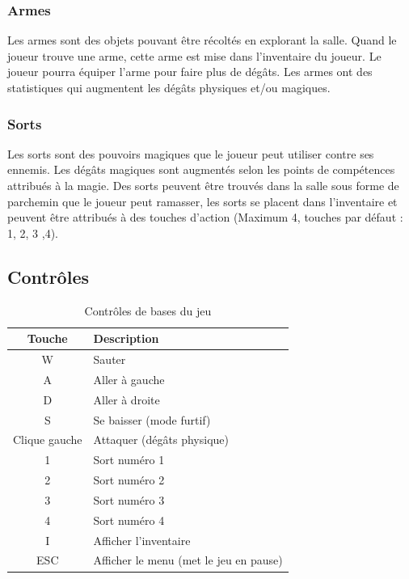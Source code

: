 \documentclass[11pt, a4paper, oneside]{report}
\begin{document}
\subsubsection{Armes}
Les armes sont des objets pouvant être récoltés en explorant la salle. Quand le joueur trouve une arme, cette arme est mise dans l'inventaire du joueur. Le joueur pourra équiper l'arme pour faire plus de dégâts. Les armes ont des statistiques qui augmentent les dégâts physiques et/ou magiques.

\subsubsection{Sorts}
Les sorts sont des pouvoirs magiques que le joueur peut utiliser contre ses ennemis. Les dégâts magiques sont augmentés selon les points de compétences attribués à la magie. Des sorts peuvent être trouvés dans la salle sous forme de parchemin que le joueur peut ramasser, les sorts se placent dans l'inventaire et peuvent être attribués à des touches d'action (Maximum 4, touches par défaut : 1, 2, 3 ,4).

\subsection{Contrôles}
\begin{table}[htp]
\begin{center}
\begin{tabular}{|c|l|}
	\hline
	\textbf{Touche} & \textbf{Description}\\
	\hline \hline
	W & Sauter\\
	\hline
	A & Aller à gauche\\
	\hline
	D & Aller à droite\\
	\hline
	S & Se baisser (mode furtif)\\
	\hline
	Clique gauche & Attaquer (dégâts physique)\\
	\hline
	1 & Sort numéro 1\\
	\hline
	2 & Sort numéro 2\\
	\hline
	3 & Sort numéro 3\\
	\hline
	4 & Sort numéro 4\\
	\hline
	I & Afficher l'inventaire\\
	\hline
	ESC & Afficher le menu (met le jeu en pause)\\
	\hline
\end{tabular}
\end{center}
\caption{Contrôles de bases du jeu}
\end{table}
\end{document}
